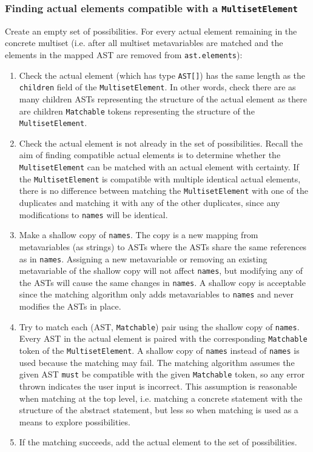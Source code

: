 \subsubsection{Finding actual elements compatible with a \texorpdfstring{\lstinline{MultisetElement}}{MultisetElement}}
Create an empty set of possibilities. For every actual element remaining in the concrete multiset (i.e. after all multiset metavariables are matched and the elements in the mapped AST are removed from \lstinline{ast.elements}):
\begin{enumerate}
    \item Check the actual element (which has type \lstinline{AST[]}) has the same length as the \lstinline{children} field of the \lstinline{MultisetElement}. In other words, check there are as many children ASTs representing the structure of the actual element as there are children \lstinline{Matchable} tokens representing the structure of the \lstinline{MultisetElement}.
    \item Check the actual element is not already in the set of possibilities. Recall the aim of finding compatible actual elements is to determine whether the \lstinline{MultisetElement} can be matched with an actual element with certainty. If the \lstinline{MultisetElement} is compatible with multiple identical actual elements, there is no difference between matching the \lstinline{MultisetElement} with one of the duplicates and matching it with any of the other duplicates, since any modifications to \lstinline{names} will be identical.
    \item Make a shallow copy of \lstinline{names}. The copy is a new mapping from metavariables (as strings) to ASTs where the ASTs share the same references as in \lstinline{names}. Assigning a new metavariable or removing an existing metavariable of the shallow copy will not affect \lstinline{names}, but modifying any of the ASTs will cause the same changes in \lstinline{names}. A shallow copy is acceptable since the matching algorithm only adds metavariables to \lstinline{names} and never modifies the ASTs in place.
    \item Try to match each (AST, \lstinline{Matchable}) pair using the shallow copy of \lstinline{names}. Every AST in the actual element is paired with the corresponding \lstinline{Matchable} token of the \lstinline{MultisetElement}. A shallow copy of \lstinline{names} instead of \lstinline{names} is used because the matching may fail. The matching algorithm assumes the given AST \lstinline{must} be compatible with the given \lstinline{Matchable} token, so any error thrown indicates the user input is incorrect. This assumption is reasonable when matching at the top level, i.e. matching a concrete statement with the structure of the abstract statement, but less so when matching is used as a means to explore possibilities.
    \item If the matching succeeds, add the actual element to the set of possibilities.
\end{enumerate}

